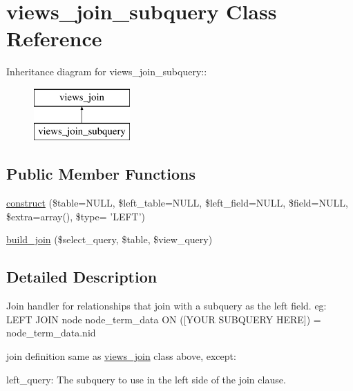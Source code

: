 \hypertarget{classviews__join__subquery}{
\section{views\_\-join\_\-subquery Class Reference}
\label{classviews__join__subquery}
}
Inheritance diagram for views\_\-join\_\-subquery::\begin{figure}[H]
\begin{center}
\leavevmode
\includegraphics[height=2cm]{classviews__join__subquery}
\end{center}
\end{figure}
\subsection*{Public Member Functions}
\begin{DoxyCompactItemize}
\item 
\hyperlink{classviews__join__subquery_a27a49742ee109b1329adcb86512837ab}{construct} (\$table=NULL, \$left\_\-table=NULL, \$left\_\-field=NULL, \$field=NULL, \$extra=array(), \$type= 'LEFT')
\item 
\hyperlink{classviews__join__subquery_aced6dd7573a138cd4f527b340fee501e}{build\_\-join} (\$select\_\-query, \$table, \$view\_\-query)
\end{DoxyCompactItemize}


\subsection{Detailed Description}
Join handler for relationships that join with a subquery as the left field. eg: LEFT JOIN node node\_\-term\_\-data ON (\mbox{[}YOUR SUBQUERY HERE\mbox{]}) = node\_\-term\_\-data.nid

join definition same as \hyperlink{classviews__join}{views\_\-join} class above, except:
\begin{DoxyItemize}
\item left\_\-query: The subquery to use in the left side of the join clause. 
\end{DoxyItemize}

